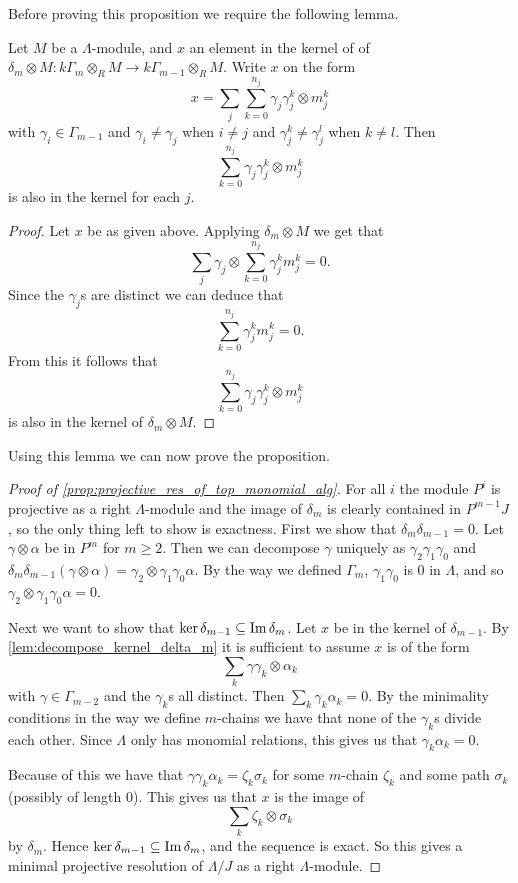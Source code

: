 Before proving this proposition we require the following lemma.

\begin{lemma}\cite[Lemma~2.1]{GKK91}\label{lem:decompose_kernel_delta_m}
	Let $M$ be a $\Lambda$-module, and $x$ an element in the kernel of of $\delta_m\otimes M\colon k\Gamma_m\otimes_R M \to k\Gamma_{m-1} \otimes_R M$. Write $x$ on the form
	$$x = \sum_j\sum_{k=0}^{n_j} \gamma_j  \gamma_j^k \otimes m_j^k$$
	with $\gamma_i \in \Gamma_{m-1}$ and $\gamma_i \neq \gamma_j$ when $i \neq j$ and $\gamma_j^k \neq \gamma_j^l$  when $k \neq l$. Then 
	$$\sum_{k=0}^{n_j} \gamma_j  \gamma_j^k \otimes m_j^k$$
	is also in the kernel for each $j$.
	\begin{proof}
		Let $x$ be as given above. Applying $\delta_m\otimes M$ we get that 
		$$\sum_j \gamma_j \otimes \sum_{k=0}^{n_j} \gamma_j^{k}m_j^{k}=0.$$ 
		Since the $\gamma_j$s are distinct we can deduce that 
		$$ \sum_{k=0}^{n_j} \gamma_j^{k}m_j^{k}=0.$$ 
		From this it follows that
		$$\sum_{k=0}^{n_j} \gamma_j  \gamma_j^k \otimes m_j^k$$
		is also in the kernel of $\delta_m \otimes M$.
	\end{proof}
\end{lemma}

Using this lemma we can now prove the proposition.

\begin{proof}[Proof of \cref{prop:projective_res_of_top_monomial_alg}]
	For all $i$ the module $P^i$ is projective as a right $\Lambda$-module and the image of $\delta_m$ is clearly contained in $P^{m-1}J$, so the only thing left to show is exactness. First we show that $\delta_m\delta_{m-1}=0$. Let $\gamma\otimes \alpha$ be in $P^m$ for $m \geq 2$. Then we can decompose $\gamma$ uniquely as $\gamma_2\gamma_1\gamma_0$ and $\delta_m\delta_{m-1}(\gamma\otimes \alpha) = \gamma_2\otimes\gamma_1\gamma_0\alpha$. By the way we defined $\Gamma_m$, $\gamma_1\gamma_0$ is 0 in $\Lambda$, and so $\gamma_2\otimes\gamma_1\gamma_0\alpha = 0$.
	
	Next we want to show that $\operatorname{ker}\delta_{m-1} \subseteq \operatorname{Im}\delta_m$. Let $x$ be in the kernel of $\delta_{m-1}$. By \cref{lem:decompose_kernel_delta_m} it is sufficient to assume $x$ is of the form
	$$\sum_k \gamma  \gamma_k \otimes \alpha_k$$
	with $\gamma \in \Gamma_{m-2}$ and the $\gamma_k$s all distinct. Then $\sum_k \gamma_k\alpha_k = 0$. By the minimality conditions in the way we define $m$-chains we have that none of the $\gamma_k$s divide each other. Since $\Lambda$ only has monomial relations, this gives us that $\gamma_{k}\alpha_{k}=0$.
	
	Because of this we have that $\gamma\gamma_k\alpha_k=\zeta_k\sigma_k$ for some $m$-chain $\zeta_k$ and some path $\sigma_k$ (possibly of length 0). This gives us that $x$ is the image of 
	$$\sum_k \zeta_k\otimes \sigma_k$$ 
	by $\delta_m$. Hence $\operatorname{ker}\delta_{m-1} \subseteq \operatorname{Im}\delta_m$, and the sequence is exact. So this gives a minimal projective resolution of $\Lambda/J$ as a right $\Lambda$-module.
\end{proof}

